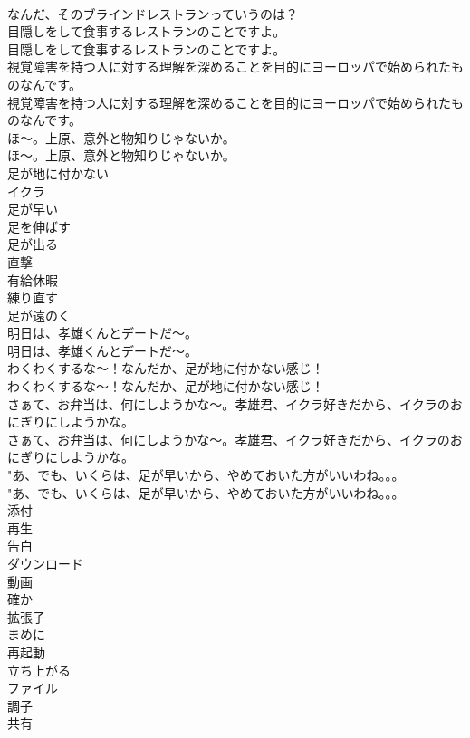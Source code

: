 \documentclass[8pt]{extreport}
\begin{document}
\begin{CJK}{UTF8}{min}
\\	なんだ、そのブラインドレストランっていうのは？ 
\\	目隠しをして食事するレストランのことですよ。	
\\	目隠しをして食事するレストランのことですよ。 
\\	視覚障害を持つ人に対する理解を深めることを目的にヨーロッパで始められたものなんです。	
\\	視覚障害を持つ人に対する理解を深めることを目的にヨーロッパで始められたものなんです。 
\\	ほ～。上原、意外と物知りじゃないか。	
\\	ほ～。上原、意外と物知りじゃないか。 
\\	足が地に付かない
\\	イクラ
\\	足が早い
\\	足を伸ばす
\\	足が出る
\\	直撃
\\	有給休暇
\\	練り直す
\\	足が遠のく
\\	明日は、孝雄くんとデートだ～。	
\\	明日は、孝雄くんとデートだ～。 
\\	わくわくするな～！なんだか、足が地に付かない感じ！	
\\	わくわくするな～！なんだか、足が地に付かない感じ！ 
\\	さぁて、お弁当は、何にしようかな～。孝雄君、イクラ好きだから、イクラのおにぎりにしようかな。	
\\	さぁて、お弁当は、何にしようかな～。孝雄君、イクラ好きだから、イクラのおにぎりにしようかな。 
\\	"あ、でも、いくらは、足が早いから、やめておいた方がいいわね。。。
\\	"あ、でも、いくらは、足が早いから、やめておいた方がいいわね。。。
\\	添付
\\	再生
\\	告白
\\	ダウンロード
\\	動画
\\	確か
\\	拡張子
\\	まめに
\\	再起動
\\	立ち上がる
\\	ファイル
\\	調子
\\	共有

\end{CJK}
\end{document}
